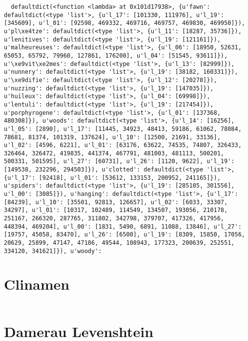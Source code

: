 \begin{verbatim}
  defaultdict(<function <lambda> at 0x101d17938>, {u'fawn': defaultdict(<type 'list'>, {u'l_17': [101330, 111976], u'l_19': [345609], u'l_01': [92598, 469332, 469716, 469757, 469830, 469950]}), u'pl\xe4tze': defaultdict(<type 'list'>, {u'l_11': [18287, 35736]}), u'lenitives': defaultdict(<type 'list'>, {u'l_19': [121161]}), u'malheureuses': defaultdict(<type 'list'>, {u'l_06': [18950, 52631, 65053, 65792, 79960, 127861, 176200], u'l_04': [51545, 93611]}), u'\xe9vit\xe2mes': defaultdict(<type 'list'>, {u'l_13': [82999]}), u'nunnery': defaultdict(<type 'list'>, {u'l_19': [38182, 160331]}), u'\xe9difie': defaultdict(<type 'list'>, {u'l_12': [20278]}), u'nuzzing': defaultdict(<type 'list'>, {u'l_19': [147035]}), u'huileux': defaultdict(<type 'list'>, {u'l_04': [69998]}), u'lentuli': defaultdict(<type 'list'>, {u'l_19': [217454]}), u'porphyrogene': defaultdict(<type 'list'>, {u'l_01': [137368, 480308]}), u'woods': defaultdict(<type 'list'>, {u'l_14': [16256], u'l_05': [2890], u'l_17': [11445, 34923, 48413, 59186, 61062, 78084, 78681, 81374, 101319, 137624], u'l_10': [12500, 21691, 33136], u'l_02': [4596, 6221], u'l_01': [63176, 63622, 74535, 74807, 326433, 326464, 326472, 419835, 441374, 467791, 481003, 481113, 500201, 500331, 501595], u'l_27': [60731], u'l_26': [1120, 9622], u'l_19': [149538, 232296, 294503]}), u'clotted': defaultdict(<type 'list'>, {u'l_17': [92418], u'l_01': [53612, 133153, 200952, 241165]}), u'spiders': defaultdict(<type 'list'>, {u'l_19': [285105, 301556], u'l_00': [3085]}), u'hanging': defaultdict(<type 'list'>, {u'l_17': [84239], u'l_10': [35501, 92813, 126657], u'l_02': [6033, 33307, 34297], u'l_01': [10317, 102489, 114549, 134507, 193056, 210178, 251167, 266320, 287765, 311802, 342798, 379707, 417326, 417956, 448394, 469204], u'l_00': [1831, 5490, 6891, 11088, 13846], u'l_27': [19757, 45058, 83470], u'l_26': [6500], u'l_19': [8309, 15850, 17056, 20629, 25899, 47147, 47186, 49544, 108943, 177323, 200639, 252551, 334120, 341621]}), u'woody':
\end{verbatim}

\section{Clinamen}

\inputminted[firstline=154,lastline=160]{python}{back/code/textsurfer.py}
% 

\section{Damerau Levenshtein}

